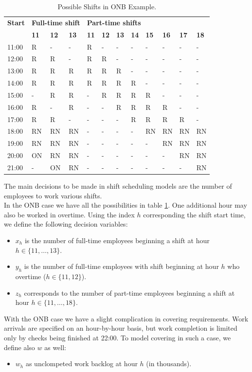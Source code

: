 \documentclass[a4paper,10 pt,titlepage,twoside]{book}
\theoremstyle{plain}
\theoremstyle{definition}
\theoremstyle{remark}
\begin{document}
\begin{table}[]\caption{\label{table:Shiftscheduling2}Possible Shifts in ONB Example.}
	\begin{center}
	\begin{tabular}{llllllllllll}
		\hline{\textbf{Start}} & \multicolumn{3}{l}{\textbf{Full-time shift}} & \multicolumn{8}{l}{\textbf{Part-time shifts}} \\ \cline{2-12} 
		& \textbf{11} & \textbf{12} & \textbf{13} & \textbf{11} & \textbf{12} & \textbf{13} & \textbf{14} & \textbf{15} & \textbf{16} & \textbf{17} & \textbf{18} \\ \hline
		11:00 & R & - & - & R & - & - & - & - & - & - & - \\
		12:00 & R & R & - & R & R & - & - & - & - & - & - \\
		13:00 & R & R & R & R & R & R & - & - & - & - & - \\
		14:00 & R & R & R & R & R & R & R & - & - & - & - \\
		15:00 & - & R & R & - & R & R & R & R & - & - & - \\
		16:00 & R & - & R & - & - & R & R & R & R & - & - \\
		17:00 & R & R & - & - & - & - & R & R & R & R & - \\
		18:00 & RN & RN & RN & - & - & - & - & RN & RN & RN & RN \\
		19:00 & RN & RN & RN & - & - & - & - & - & RN & RN & RN \\
		20:00 & ON & RN & RN & - & - & - & - & - & - & RN & RN \\
		21:00 & - & ON & RN & - & - & - & - & - & - & - & RN \\ \hline
	\end{tabular}
	\end{center}
\end{table}
The main decisions to be made in shift scheduling models are the number of employees to work various shifts. \\In the ONB case we have all the possibilities in table \ref{table:Shiftscheduling2}. One additional hour may also be worked in overtime.
Using the index $h$ corresponding the shift start time, we define the following decision variables:
\begin{itemize}
	\item $x_{h}$ is the number of full-time employees beginning a shift at hour $h \in \{11, \dots, 13\}$.
	\item $y_{h}$ is the number of full-time employees with shift beginning at hour $h$ who overtime ($h \in \{11, 12\}$).
	\item $z_{h}$ corresponds to the number of part-time employees beginning a shift at hour $h\in\{11, \dots, 18\}$.
\end{itemize}
With the ONB case we have a slight complication in covering requirements. Work arrivals are specified on an hour-by-hour basis, but work completion is limited only by checks being finished at 22:00. To model covering in such a case, we define also $w$ as well:
\begin{itemize}
	\item $w_{h}$ as unclompeted work backlog at hour $h$ (in thousands).
\end{itemize}
\end{document}

